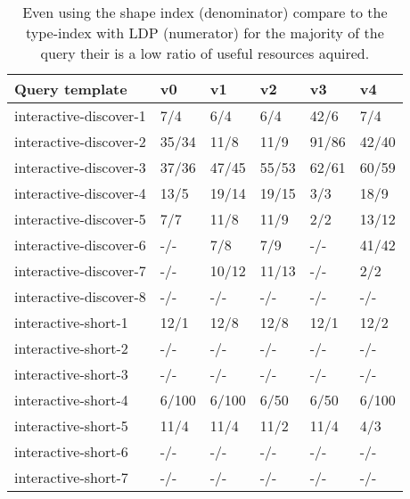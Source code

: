 \begin{table}
	\begin{center}
		\begin{tabular}{|l|l|l|l|l|l|}
			\hline
			Query template & v0 & v1 & v2 & v3 & v4 \\
			\hline
			interactive-discover-1 & 7/4 & 6/4 & 6/4 & 42/6 & 7/4 \\
			\hline
			interactive-discover-2 & 35/34 & 11/8 & 11/9 & 91/86 & 42/40 \\
			\hline
			interactive-discover-3 & 37/36 & 47/45 & 55/53 & 62/61 & 60/59 \\
			\hline
			interactive-discover-4 & 13/5 & 19/14 & 19/15 & 3/3 & 18/9 \\
			\hline
			interactive-discover-5 & 7/7 & 11/8 & 11/9 & 2/2 & 13/12 \\
			\hline
			interactive-discover-6 & -/- & 7/8 & 7/9 & -/- & 41/42 \\
			\hline
			interactive-discover-7 & -/- & 10/12 & 11/13 & -/- & 2/2 \\
			\hline
			interactive-discover-8 & -/- & -/- & -/- & -/- & -/- \\
			\hline
			interactive-short-1 & 12/1 & 12/8 & 12/8 & 12/1 & 12/2 \\
			\hline
			interactive-short-2 & -/- & -/- & -/- & -/- & -/- \\
			\hline
			interactive-short-3 & -/- & -/- & -/- & -/- & -/- \\
			\hline
			interactive-short-4 & 6/100 & 6/100 & 6/50 & 6/50 & 6/100 \\
			\hline
			interactive-short-5 & 11/4 & 11/4 & 11/2 & 11/4 & 4/3 \\
			\hline
			interactive-short-6 & -/- & -/- & -/- & -/- & -/- \\
			\hline
			interactive-short-7 & -/- & -/- & -/- & -/- & -/- \\
			\hline
		\end{tabular}
	\end{center}
	\caption{Even using the shape index (denominator) compare to the type-index with LDP (numerator) for the majority of the query their is a low ratio of useful resources aquired.}
	\label{tab:ratioUsefulResources}
\end{table}